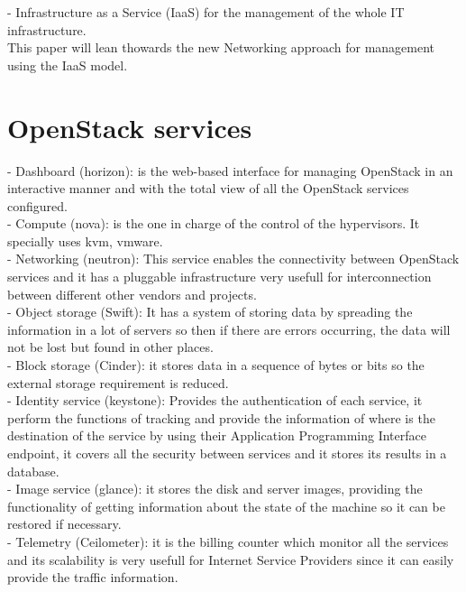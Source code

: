 - Infrastructure as a Service (IaaS) for the management of the whole IT infrastructure.\\

This paper will lean thowards the new Networking approach for management using the IaaS model.
 
\section{OpenStack services}
 
- Dashboard (horizon): is the web-based interface for managing OpenStack in an interactive manner and with the total view of all the OpenStack services configured.\\

- Compute (nova): is the one in charge of the control of the hypervisors. It specially uses kvm, vmware.\\

- Networking (neutron): This service enables the connectivity between OpenStack services and it has a pluggable infrastructure very usefull for interconnection between different other vendors and projects.\\

- Object storage (Swift): It has a system of storing data by spreading the information in a lot of servers so then if there are errors occurring, the data will not be lost but found in other places.\\

- Block storage (Cinder): it stores data in a sequence of bytes or bits so the external storage requirement is reduced.\\

- Identity service (keystone): Provides the authentication of each service, it perform the functions of tracking and provide the information of where is the destination of the service by using their Application Programming Interface endpoint, it covers all the security between services and it stores its results in a database. \\

- Image service (glance): it stores the disk and server images, providing the functionality of getting information about the state of the machine so it can be restored if necessary. \\

- Telemetry (Ceilometer): it is the billing counter which monitor all the services and its scalability is very usefull for Internet Service Providers since it can easily provide the traffic information.\\
 
